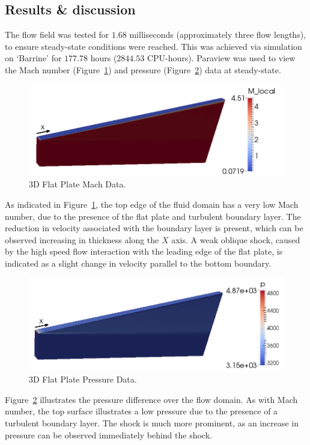 \clearpage
\subsection{Results \& discussion}
The flow field was tested for $1.68$ milliseconds (approximately three flow lengths), to ensure steady-state conditions were reached. This was achieved via simulation on `Barrine' for $177.78$ hours ($2844.53$ CPU-hours). Paraview was used to view the Mach number (Figure~\ref{f:tc1:mach}) and pressure (Figure~\ref{f:tc1:pressure}) data at steady-state.
%
\begin{figure}[htbp]
 \begin{center}
  \includegraphics[width=16cm]{./chap6-3Dflatplate/figs/testcase1mach2.png}
  \caption{3D Flat Plate Mach Data.}
  \label{f:tc1:mach}
 \end{center}
\end{figure}
%

As indicated in Figure~\ref{f:tc1:mach}, the top edge of the fluid domain has a very low Mach number, due to the presence of the flat plate and turbulent boundary layer. The reduction in velocity associated with the boundary layer is present, which can be observed increasing in thickness along the $X$ axis.
A weak oblique shock, caused by the high speed flow interaction with the leading edge of the flat plate, is indicated as a slight change in velocity parallel to the bottom  boundary.
%
\begin{figure}[htbp]
 \begin{center}
  \includegraphics[width=16cm]{./chap6-3Dflatplate/figs/testcase1pressure2.png}
  \caption{3D Flat Plate Pressure Data.}
  \label{f:tc1:pressure}
 \end{center}
\end{figure}
%
Figure~\ref{f:tc1:pressure} illustrates the pressure difference over the flow domain. As with Mach number, the top surface illustrates a low pressure due to the presence of a turbulent boundary layer. The shock is much more prominent, as an increase in pressure can be observed immediately behind the shock.

